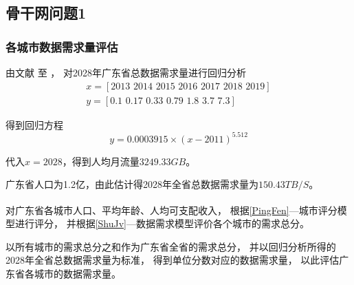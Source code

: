 \documentclass[UTF8,12pt]{ctexart}
\newcommand{\upcite}[1]{\textsuperscript{\cite{#1}}}
\begin{document}
    \subsection{骨干网问题1}
        \subsubsection[网络需求评估]{各城市数据需求量评估}\label{WLXQPG}
            由文献\cite{yjJJ} 至 \cite{ysJJ}，
            对2028年广东省总数据需求量进行回归分析
            \begin{gather*}
                x=[2013\,\, 2014\,\, 2015\,\, 2016\,\, 2017\,\, 2018\,\, 2019]\\
                y=[0.1\,\, 0.17\,\, 0.33\,\, 0.79\,\, 1.8\,\, 3.7\,\, 7.3]
            \end{gather*}\par
            得到回归方程$$y=0.0003915×(x-2011)^{5.512}$$\par
            代入$x=2028$，得到人均月流量$3249.33GB$。\par
            广东省人口为1.2亿，由此估计得2028年全省总数据需求量为$150.43TB/S$。\par
            对广东省各城市人口、平均年龄、人均可支配收入\upcite{CSSJ}，
            根据\ref{PingFen}—城市评分模型进行评分，
            并根据\ref{ShuJv}—数据需求模型评价各个城市的需求总分。\par
            以所有城市的需求总分之和作为广东省全省的需求总分，
            并以回归分析所得的2028年全省总数据需求量为标准，
            得到单位分数对应的数据需求量，
            以此评估广东省各城市的数据需求量。
\end{document}
